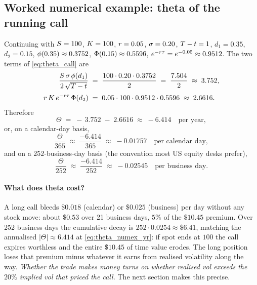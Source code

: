 \subsection{Worked numerical example: theta of the running call}
\label{subsec:ch16_theta_numex}

Continuing with $S = 100$, $K = 100$, $r = 0.05$,
$\sigma = 0.20$, $T - t = 1$, $d_1 = 0.35$, $d_2 = 0.15$,
$\phi(0.35) \approx 0.3752$, $\Phi(0.15) \approx 0.5596$,
$e^{-r \tau} = e^{-0.05} \approx 0.9512$. The two terms of
\eqref{eq:theta_call} are
\begin{align}
  \frac{S\,\sigma\,\phi(d_1)}{2\,\sqrt{T - t}}
   \;&=\; \frac{100 \cdot 0.20 \cdot 0.3752}{2}
        \;=\; \frac{7.504}{2}
        \;\approx\; 3.752,
  \label{eq:theta_term1}\\[0.25em]
  r\,K\,e^{-r \tau}\,\Phi(d_2)
   \;&=\; 0.05 \cdot 100 \cdot 0.9512 \cdot 0.5596
        \;\approx\; 2.6616.
  \label{eq:theta_term2}
\end{align}
Therefore
\begin{equation}
  \Theta \;=\; -\,3.752 \;-\; 2.6616 \;\approx\; -6.414
  \quad \text{per year},
  \label{eq:theta_numex_yr}
\end{equation}
or, on a calendar-day basis,
\begin{equation}
  \frac{\Theta}{365} \;\approx\; \frac{-6.414}{365} \;\approx\; -0.01757
  \quad \text{per calendar day},
  \label{eq:theta_numex_day_cal}
\end{equation}
and on a $252$-business-day basis (the convention most US equity
desks prefer),
\begin{equation}
  \frac{\Theta}{252} \;\approx\; \frac{-6.414}{252} \;\approx\; -0.02545
  \quad \text{per business day}.
  \label{eq:theta_numex_day_bd}
\end{equation}

\paragraph{What does theta cost?}
A long call bleeds $\$0.018$ (calendar) or $\$0.025$ (business)
per day without any stock move: about $\$0.53$ over 21 business
days, $5\%$ of the $\$10.45$ premium. Over 252 business days the
cumulative decay is $252 \cdot 0.0254 \approx \$6.41$, matching the
annualised $|\Theta| \approx 6.414$ at \eqref{eq:theta_numex_yr}:
if spot ends at $100$ the call expires worthless and the entire
$\$10.45$ of time value erodes. The long position loses that
premium minus whatever it earns from realised volatility along the
way. \emph{Whether the trade makes money turns on whether realised
vol exceeds the $20\%$ implied vol that priced the call.} The next
section makes this precise.

